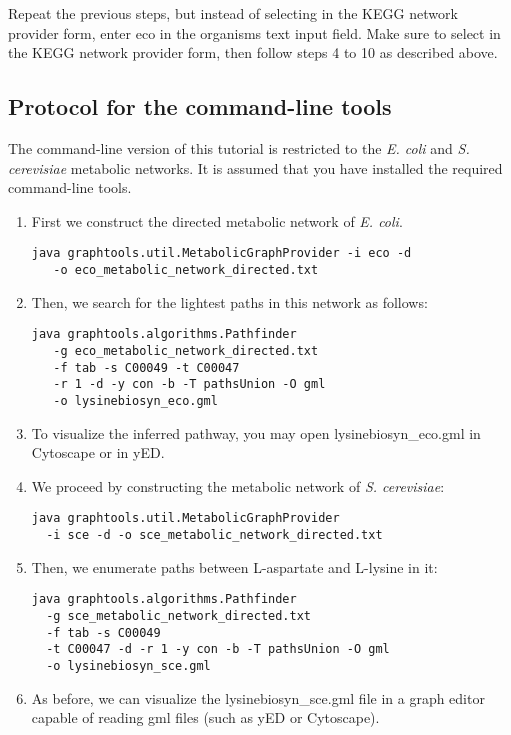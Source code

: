 Repeat the previous steps, but instead of selecting  in the KEGG network provider form, enter eco
in the organisms text input field. Make sure to select  in the KEGG network provider form,
then follow steps 4 to 10 as described above.

\subsection{Protocol for the command-line tools}

The command-line version of this tutorial is restricted to the \textit{E. coli} and \textit{S. cerevisiae}
metabolic networks. It is assumed that you have installed the required command-line tools.

\begin{enumerate}

\item First we construct the directed metabolic network of \textit{E. coli}.

\begin{lstlisting}
java graphtools.util.MetabolicGraphProvider -i eco -d 
   -o eco_metabolic_network_directed.txt
\end{lstlisting}

\item Then, we search for the lightest paths in this network as follows:


\begin{lstlisting}
java graphtools.algorithms.Pathfinder 
   -g eco_metabolic_network_directed.txt 
   -f tab -s C00049 -t C00047 
   -r 1 -d -y con -b -T pathsUnion -O gml 
   -o lysinebiosyn_eco.gml
\end{lstlisting}


\item To visualize the inferred pathway, you may open lysinebiosyn\_eco.gml in Cytoscape or in yED.


\item We proceed by constructing the metabolic network of \textit{S. cerevisiae}:

\begin{lstlisting}
java graphtools.util.MetabolicGraphProvider
  -i sce -d -o sce_metabolic_network_directed.txt
\end{lstlisting}

\item Then, we enumerate paths between L-aspartate and L-lysine in it:

\begin{lstlisting}
java graphtools.algorithms.Pathfinder
  -g sce_metabolic_network_directed.txt
  -f tab -s C00049
  -t C00047 -d -r 1 -y con -b -T pathsUnion -O gml
  -o lysinebiosyn_sce.gml
\end{lstlisting}

\item As before, we can visualize the lysinebiosyn\_sce.gml file in a graph editor capable of reading gml files
     (such as yED or Cytoscape).

\end{enumerate}

